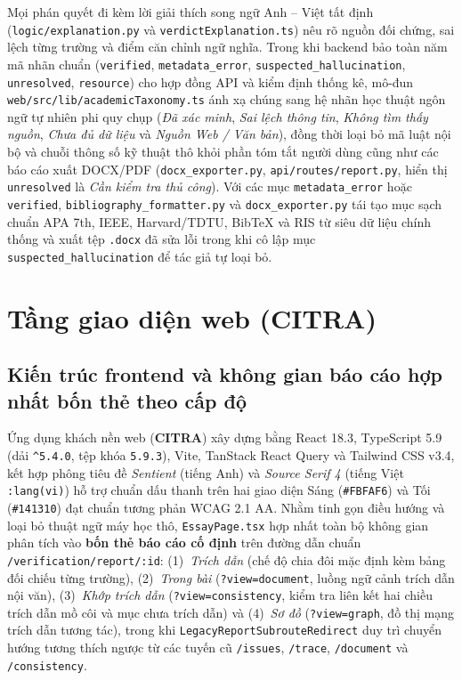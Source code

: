 Mọi phán quyết đi kèm lời giải thích song ngữ Anh -- Việt tất định (\texttt{logic/explanation.py} và \texttt{verdictExplanation.ts}) nêu rõ nguồn đối chứng, sai lệch từng trường và điểm căn chỉnh ngữ nghĩa. Trong khi backend bảo toàn năm mã nhãn chuẩn (\texttt{verified}, \texttt{metadata\_error}, \texttt{suspected\_hallucination}, \texttt{unresolved}, \texttt{resource}) cho hợp đồng API và kiểm định thống kê, mô-đun \texttt{web/src/lib/academicTaxonomy.ts} ánh xạ chúng sang hệ nhãn học thuật ngôn ngữ tự nhiên phi quy chụp (\textit{Đã xác minh}, \textit{Sai lệch thông tin}, \textit{Không tìm thấy nguồn}, \textit{Chưa đủ dữ liệu} và \textit{Nguồn Web / Văn bản}), đồng thời loại bỏ mã luật nội bộ và chuỗi thông số kỹ thuật thô khỏi phần tóm tắt người dùng cũng như các báo cáo xuất DOCX/PDF (\texttt{docx\_exporter.py}, \texttt{api/routes/report.py}, hiển thị \texttt{unresolved} là \textit{Cần kiểm tra thủ công}). Với các mục \texttt{metadata\_error} hoặc \texttt{verified}, \texttt{bibliography\_formatter.py} và \texttt{docx\_exporter.py} tái tạo mục sạch chuẩn APA 7th, IEEE, Harvard/TDTU, BibTeX và RIS từ siêu dữ liệu chính thống và xuất tệp \texttt{.docx} đã sửa lỗi trong khi cô lập mục \texttt{suspected\_hallucination} để tác giả tự loại bỏ.

\section{Tầng giao diện web (CITRA)}

\subsection[Kiến trúc frontend và không gian 4 thẻ theo cấp độ]{Kiến trúc frontend và không gian báo cáo hợp nhất bốn thẻ theo cấp độ}

Ứng dụng khách nền web (\textbf{CITRA}) xây dựng bằng React 18.3, TypeScript 5.9 (dải \texttt{\string^5.4.0}, tệp khóa \texttt{5.9.3}), Vite, TanStack React Query và Tailwind CSS v3.4, kết hợp phông tiêu đề \textit{Sentient} (tiếng Anh) và \textit{Source Serif 4} (tiếng Việt \texttt{:lang(vi)}) hỗ trợ chuẩn dấu thanh trên hai giao diện Sáng (\texttt{\#FBFAF6}) và Tối (\texttt{\#141310}) đạt chuẩn tương phản WCAG 2.1 AA. Nhằm tinh gọn điều hướng và loại bỏ thuật ngữ máy học thô, \texttt{EssayPage.tsx} hợp nhất toàn bộ không gian phân tích vào \textbf{bốn thẻ báo cáo cố định} trên đường dẫn chuẩn \texttt{/verification/report/:id}: (1)~\textit{Trích dẫn} (chế độ chia đôi mặc định kèm bảng đối chiếu từng trường), (2)~\textit{Trong bài} (\texttt{?view=document}, luồng ngữ cảnh trích dẫn nội văn), (3)~\textit{Khớp trích dẫn} (\texttt{?view=consistency}, kiểm tra liên kết hai chiều trích dẫn mồ côi và mục chưa trích dẫn) và (4)~\textit{Sơ đồ} (\texttt{?view=graph}, đồ thị mạng trích dẫn tương tác), trong khi \texttt{LegacyReportSubrouteRedirect} duy trì chuyển hướng tương thích ngược từ các tuyến cũ \texttt{/issues}, \texttt{/trace}, \texttt{/document} và \texttt{/consistency}.


